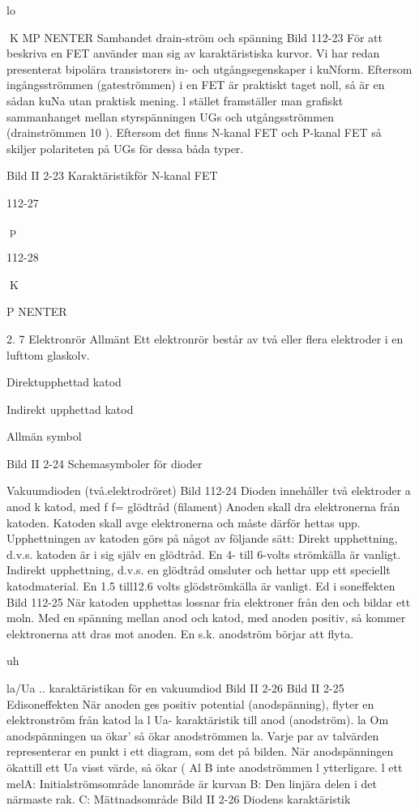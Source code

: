 \documentclass[a4paper,twoside,twocolumn,openright]{book}
\begin{document}
{{{{lo

K MP NENTER
Sambandet drain-ström och spänning
Bild 112-23
För att beskriva en FET använder man sig
av karaktäristiska kurvor. Vi har redan presenterat bipolära transistorers in- och utgångsegenskaper i kuNform. Eftersom ingångsströmmen (gateströmmen) i en FET
är praktiskt taget noll, så är en sådan kuNa
utan praktisk mening. l stället framställer
man grafiskt sammanhanget mellan styrspänningen UGs och utgångsströmmen (drainströmmen 10 ). Eftersom det finns N-kanal
FET och P-kanal FET så skiljer polariteten
på UGs för dessa båda typer.

Bild II 2-23 Karaktäristikför N-kanal FET

112-27

p

112-28

K

P NENTER

2. 7 Elektronrör
Allmänt
Ett elektronrör består av två eller flera elektroder i en lufttom glaskolv.

Direktupphettad
katod

Indirekt upphettad katod

Allmän
symbol

Bild II 2-24 Schemasymboler för dioder

Vakuumdioden (två.elektrodröret)
Bild 112-24
Dioden innehåller två elektroder
a anod
k katod, med f f= glödtråd (filament)
Anoden skall dra elektronerna från katoden.
Katoden skall avge elektronerna och måste
därför hettas upp.
Upphettningen av katoden görs på något
av följande sätt:
Direkt upphettning, d.v.s. katoden är i sig
själv en glödtråd. En 4- till 6-volts strömkälla
är vanligt.
Indirekt upphettning, d.v.s. en glödtråd
omsluter och hettar upp ett speciellt katodmaterial. En 1.5 till12.6 volts glödströmkälla
är vanligt.
Ed i soneffekten
Bild 112-25
När katoden upphettas lossnar fria elektroner från den och bildar ett moln. Med en
spänning mellan anod och katod, med
anoden positiv, så kommer elektronerna att
dras mot anoden. En s.k. anodström börjar
att flyta.

uh

la/Ua .. karaktäristikan för en vakuumdiod
Bild II 2-26
Bild II 2-25 Edisoneffekten
När anoden ges positiv potential (anodspänning), flyter en elektronström från katod
la l Ua- karaktäristik
till anod (anodström).
la
Om anodspänningen
ua ökar' så ökar anodströmmen la. Varje
par av talvärden representerar en punkt
i ett diagram, som det
på bilden. När anodspänningen ökattill ett
Ua
visst värde, så ökar
(
Al B
inte anodströmmen
l
ytterligare.
l ett melA: Initialströmsområde
lanområde är kurvan
B: Den linjära delen
i det närmaste rak.
C: Mättnadsområde
Bild II 2-26 Diodens karaktäristik

}}}}
\end{document}
